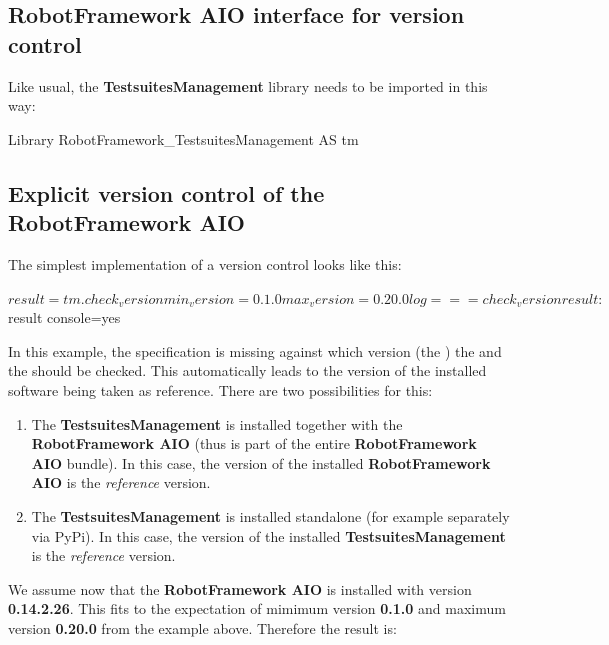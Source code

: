 \subsection{RobotFramework AIO interface for version control}

Like usual, the \textbf{TestsuitesManagement} library needs to be imported in this way:

\begin{robotcode}
Library    RobotFramework_TestsuitesManagement    AS    tm
\end{robotcode}

\subsection{Explicit version control of the RobotFramework AIO}

The simplest implementation of a version control looks like this:

\begin{robotcode}
${result}=    tm.check_version    min_version=0.1.0    max_version=0.20.0
log     === check_version result: ${result}    console=yes
\end{robotcode}

In this example, the specification is missing against which version (the ) the 
and the  should be checked. This automatically leads to the version of the installed software being taken as reference.
There are two possibilities for this:

\begin{enumerate}
   \item The \textbf{TestsuitesManagement} is installed together with the \textbf{RobotFramework AIO} (thus is part of the entire
         \textbf{RobotFramework AIO} bundle).
         In this case, the version of the installed \textbf{RobotFramework AIO} is the \textit{reference} version.
   \item The \textbf{TestsuitesManagement} is installed standalone (for example separately via PyPi).
         In this case, the version of the installed \textbf{TestsuitesManagement} is the \textit{reference} version.
\end{enumerate}

We assume now that the \textbf{RobotFramework AIO} is installed with version \textbf{0.14.2.26}. This fits to the expectation of
mimimum version \textbf{0.1.0} and maximum version \textbf{0.20.0} from the example above. Therefore the result is:

